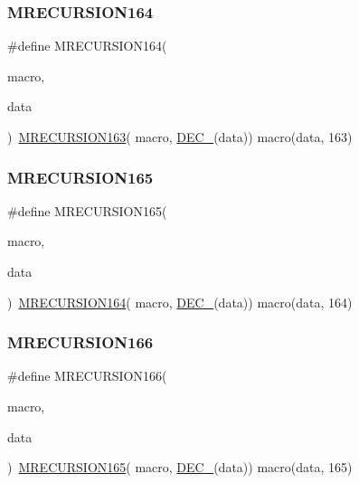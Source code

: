 \subsubsection{\texorpdfstring{MRECURSION164}{MRECURSION164}}
{\footnotesize\ttfamily \#define M\+R\+E\+C\+U\+R\+S\+I\+O\+N164(\begin{DoxyParamCaption}\item[{}]{macro,  }\item[{}]{data }\end{DoxyParamCaption})~\mbox{\hyperlink{group__group__sam0__utils__mrecursion_ga9afa4ec669818640ed94de0404f0e982}{M\+R\+E\+C\+U\+R\+S\+I\+O\+N163}}(  macro, \mbox{\hyperlink{group__group__sam0__utils__mrecursion_ga1d23d683797679dca8c3512a54a5dcae}{D\+E\+C\+\_\+}}(data))   macro(data, 163)}

\mbox{\label{group__group__sam0__utils__mrecursion_ga66969ef41cc8bef39c450f9b204a99ce}} 
\subsubsection{\texorpdfstring{MRECURSION165}{MRECURSION165}}
{\footnotesize\ttfamily \#define M\+R\+E\+C\+U\+R\+S\+I\+O\+N165(\begin{DoxyParamCaption}\item[{}]{macro,  }\item[{}]{data }\end{DoxyParamCaption})~\mbox{\hyperlink{group__group__sam0__utils__mrecursion_gaca0807249e00f403e7a8af24aae6e921}{M\+R\+E\+C\+U\+R\+S\+I\+O\+N164}}(  macro, \mbox{\hyperlink{group__group__sam0__utils__mrecursion_ga1d23d683797679dca8c3512a54a5dcae}{D\+E\+C\+\_\+}}(data))   macro(data, 164)}

\mbox{\label{group__group__sam0__utils__mrecursion_ga15ec150303a94ea66c95c878e13013c7}} 
\subsubsection{\texorpdfstring{MRECURSION166}{MRECURSION166}}
{\footnotesize\ttfamily \#define M\+R\+E\+C\+U\+R\+S\+I\+O\+N166(\begin{DoxyParamCaption}\item[{}]{macro,  }\item[{}]{data }\end{DoxyParamCaption})~\mbox{\hyperlink{group__group__sam0__utils__mrecursion_ga66969ef41cc8bef39c450f9b204a99ce}{M\+R\+E\+C\+U\+R\+S\+I\+O\+N165}}(  macro, \mbox{\hyperlink{group__group__sam0__utils__mrecursion_ga1d23d683797679dca8c3512a54a5dcae}{D\+E\+C\+\_\+}}(data))   macro(data, 165)}

